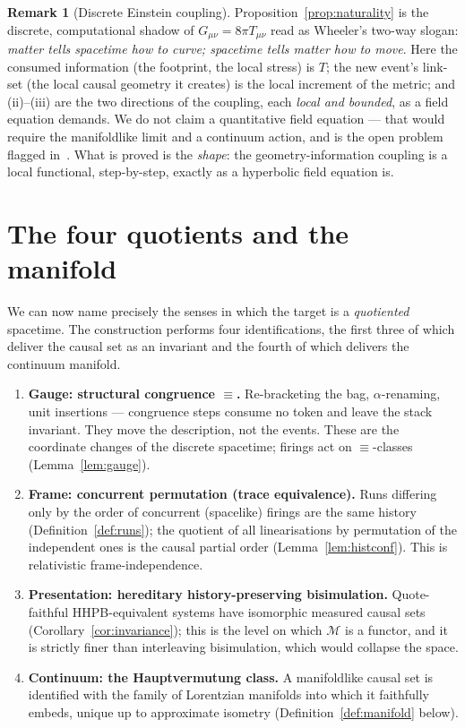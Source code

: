 \documentclass[11pt]{article}
\theoremstyle{definition}
\newtheorem{remark}[definition]{Remark}
\theoremstyle{plain}
\newcommand{\Seq}{\equiv}
\newcommand{\Map}{\mathcal{M}}
\theoremstyle{remark}
\begin{document}
\begin{remark}[Discrete Einstein coupling]
Proposition~\ref{prop:naturality} is the discrete, computational shadow
of $G_{\mu\nu} = 8\pi T_{\mu\nu}$ read as Wheeler's two-way slogan:
\emph{matter tells spacetime how to curve; spacetime tells matter how to
move}. Here the consumed information (the footprint, the local stress) is
$T$; the new event's link-set (the local causal geometry it creates) is
the local increment of the metric; and (ii)--(iii) are the two directions
of the coupling, each \emph{local and bounded}, as a field equation
demands. We do not claim a quantitative field equation --- that would
require the manifoldlike limit and a continuum action, and is the open
problem flagged in~\cite{CostNote}. What is proved is the \emph{shape}:
the geometry-information coupling is a local functional, step-by-step,
exactly as a hyperbolic field equation is.
\end{remark}

\section{The four quotients and the manifold}
\label{sec:quotients}

We can now name precisely the senses in which the target is a
\emph{quotiented} spacetime. The construction performs four
identifications, the first three of which deliver the causal set as an
invariant and the fourth of which delivers the continuum manifold.

\begin{enumerate}[label=\textbf{(Q\arabic*)},leftmargin=3.2em,itemsep=3pt]
\item \textbf{Gauge: structural congruence $\Seq$.} Re-bracketing the
bag, $\alpha$-renaming, unit insertions --- congruence steps consume no
token and leave the stack invariant. They move the description, not the
events. These are the coordinate changes of the discrete spacetime;
firings act on $\Seq$-classes (Lemma~\ref{lem:gauge}).

\item \textbf{Frame: concurrent permutation (trace equivalence).} Runs
differing only by the order of concurrent (spacelike) firings are the
same history (Definition~\ref{def:runs}); the quotient of all
linearisations by permutation of the independent ones is the causal
partial order (Lemma~\ref{lem:histconf}). This is relativistic
frame-independence.

\item \textbf{Presentation: hereditary history-preserving bisimulation.}
Quote-faithful HHPB-equivalent systems have isomorphic measured causal
sets (Corollary~\ref{cor:invariance}); this is the level on which $\Map$
is a functor, and it is strictly finer than interleaving bisimulation,
which would collapse the space.

\item \textbf{Continuum: the Hauptvermutung class.} A manifoldlike causal
set is identified with the family of Lorentzian manifolds into which it
faithfully embeds, unique up to approximate isometry
(Definition~\ref{def:manifold} below).
\end{enumerate}
\end{document}
